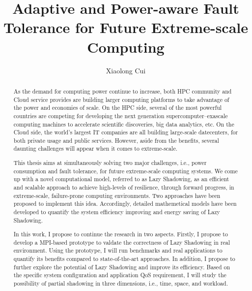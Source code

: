 \documentclass[driverfallback=dvipdfmx,final]{pittetd}
\title[Adaptive and Power-aware Fault Tolerance for Future Extreme-scale Computing]
{Adaptive and Power-aware Fault Tolerance for Future Extreme-scale Computing}
\author{Xiaolong Cui}
\begin{document}
\maketitle
%
\makecommittee
\copyrightpage                     %
\begin{abstract}
As the demand for computing power continue to increase, both HPC community and Cloud service provides are building larger computing platforms to take advantage of the power and economies of scale. On the HPC side, several of the most powerful countries are competing for developing the next generation supercomputer--exascale computing machines to accelerate scientific discoveries, big data analytics, etc. On the Cloud side, the world's largest IT companies are all building large-scale datecenters, for both private usage and public services. However, aside from the benefits, several daunting challenges will appear when it comes to extreme-scale.

This thesis aims at simultaneously solving two major challenges, i.e., power consumption and fault tolerance, for future extreme-scale computing systems. We come up with a novel computational model, referred to as Lazy Shadowing, as an efficient and scalable approach to achieve high-levels of resilience, through forward progress, in extreme-scale, failure-prone computing environments. Two approaches have been proposed to implement this idea. Accordingly, detailed mathemetical models have been developed to quantify the system efficiency improving and energy saving of Lazy Shadowing. 

In this work, I propose to continue the research in two aspects. Firstly, I propose to develop a MPI-based prototype to valdate the correctness of Lazy Shadowing in real environment. Using the prototype, I will run benchmarks and real applications to quantify its benefits compared to state-of-the-art approaches. In addition, I propose to further explore the potential of Lazy Shadowing and improve its efficiency. Based on the specific system configuration and application QoS requirement, I will study the possibility of partial shadowing in three dimensions, i.e., time, space, and workload.     

\end{abstract}
\end{document}
